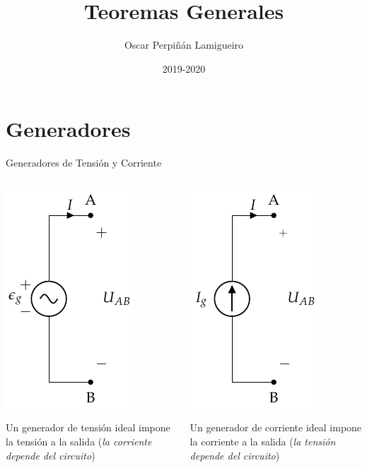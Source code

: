 \documentclass[xcolor={usenames,svgnames,dvipsnames}]{beamer}
\author{Oscar Perpiñán Lamigueiro}
\date{2019-2020}
\title{Teoremas Generales}
\begin{document}
\maketitle

\section{Generadores}
\label{sec:org8ddfe6f}

\begin{frame}[label={sec:org3ce2c82}]{Generadores de Tensión y Corriente}
\begin{columns}
\begin{column}{0.5\columnwidth}
\begin{center}
\includegraphics[height=0.6\textheight]{figs/FuenteTensionIdeal.pdf}
\end{center}
Un \alert{generador de tensión ideal} impone la tensión a la salida (\emph{la corriente depende del circuito})
\end{column}

\begin{column}{0.5\columnwidth}
\begin{center}
\includegraphics[height=0.6\textheight]{figs/FuenteCorrienteIdeal.pdf}
\end{center}
Un \alert{generador de corriente ideal} impone la corriente a la salida (\emph{la tensión depende del circuito})
\end{column}
\end{columns}
\end{frame}
\end{document}
